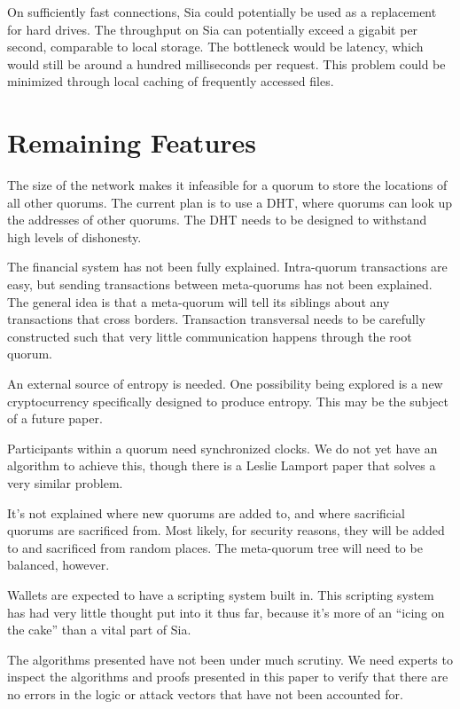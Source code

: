 \documentclass[twocolumn]{article}
\begin{document}
On sufficiently fast connections, Sia could potentially be used as a replacement for hard drives.
The throughput on Sia can potentially exceed a gigabit per second, comparable to local storage.
The bottleneck would be latency, which would still be around a hundred milliseconds per request.
This problem could be minimized through local caching of frequently accessed files.

\section{Remaining Features}
The size of the network makes it infeasible for a quorum to store the locations of all other quorums.
The current plan is to use a DHT, where quorums can look up the addresses of other quorums.
The DHT needs to be designed to withstand high levels of dishonesty.

The financial system has not been fully explained.
Intra-quorum transactions are easy, but sending transactions between meta-quorums has not been explained.
The general idea is that a meta-quorum will tell its siblings about any transactions that cross borders.
Transaction transversal needs to be carefully constructed such that very little communication happens through the root quorum.

An external source of entropy is needed.
One possibility being explored is a new cryptocurrency specifically designed to produce entropy.
This may be the subject of a future paper.

Participants within a quorum need synchronized clocks.
We do not yet have an algorithm to achieve this, though there is a Leslie Lamport paper that solves a very similar problem.

It's not explained where new quorums are added to, and where sacrificial quorums are sacrificed from.
Most likely, for security reasons, they will be added to and sacrificed from random places.
The meta-quorum tree will need to be balanced, however.

Wallets are expected to have a scripting system built in.
This scripting system has had very little thought put into it thus far, because it's more of an ``icing on the cake'' than a vital part of Sia.

The algorithms presented have not been under much scrutiny.
We need experts to inspect the algorithms and proofs presented in this paper to verify that there are no errors in the logic or attack vectors that have not been accounted for.
\vfill\break
\end{document}
